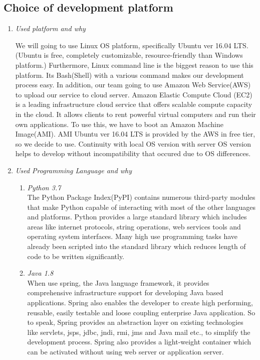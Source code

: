 \documentclass[conference]{IEEEtran}
\begin{document}
\subsection{Choice of development platform}
\begin{enumerate}
  \item
  \textit{Used platform and why}
   
We will going to use Linux OS platform, specifically Ubuntu ver 16.04 LTS.  (Ubuntu is free, completely customizable, resource-friendly than Windows platform.) Furthermore, Linux command line is the biggest reason to use this platform. Its Bash(Shell) with a various command makes our development process easy.
In addition, our team going to use Amazon Web Service(AWS) to upload our service to cloud server. Amazon Elastic Compute Cloud (EC2) is a leading infrastructure cloud service that offers scalable compute capacity in the cloud. It allows clients to rent powerful virtual computers and run their own applications. To use this, we have to boot an Amazon Machine Image(AMI). AMI Ubuntu ver 16.04 LTS is provided by the AWS in free tier, so we decide to use. Continuity with local OS version with server OS version helps to develop without incompatibility that occured due to OS differences.
\\
 
   \item \textit{Used Programming Language and why}
       \begin{enumerate}
        \item \textit{Python 3.7}
\\The Python Package Index(PyPI) contains numerous third-party modules that make Python capable of interacting with most of the other languages and platforms. Python provides a large standard library which includes areas like internet protocols, string operations, web services tools and operating system interfaces. Many high use programming tasks have already been scripted into the standard library which reduces length of code to be written significantly.\\
 
        \item \textit{Java 1.8}
 \\When use spring, the Java language framework, it provides comprehensive infrastructure support for developing Java based applications. Spring also enables the developer to create high performing, reusable, easily testable and loose coupling enterprise Java application. So to speak, Spring provides an abstraction layer on existing technologies like servlets, jsps, jdbc, jndi, rmi, jms and Java mail etc., to simplify the development process. Spring also provides a light-weight container which can be activated without using web server or application server.\\
   

\end{enumerate}
\end{enumerate}
\end{document}
